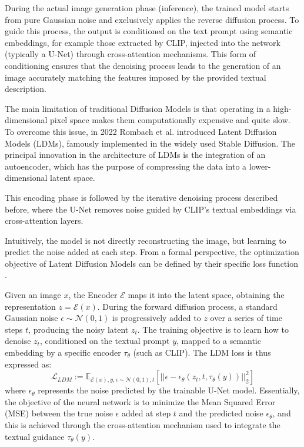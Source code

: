 \documentclass[10pt,twocolumn,letterpaper]{article}
\begin{document}
During the actual image generation phase (inference), the trained model starts from pure Gaussian noise and exclusively applies the reverse diffusion process. To guide this process, the output is conditioned on the text prompt using semantic embeddings, for example those extracted by CLIP, injected into the network (typically a U-Net) through cross-attention mechanisms. This form of conditioning ensures that the denoising process leads to the generation of an image accurately matching the features imposed by the provided textual description.

The main limitation of traditional Diffusion Models is that operating in a high-dimensional pixel space makes them computationally expensive and quite slow. To overcome this issue, in 2022 Rombach et al. \cite{Rombach_2022_CVPR} introduced Latent Diffusion Models (LDMs), famously implemented in the widely used Stable Diffusion.
The principal innovation in the architecture of LDMs is the integration of an autoencoder, which has the purpose of compressing the data into a lower-dimensional latent space. 

This encoding phase is followed by the iterative denoising process described before, where the U-Net removes noise guided by CLIP's textual embeddings via cross-attention layers.

Intuitively, the model is not directly reconstructing the image, but learning to predict the noise added at each step. From a formal perspective, the optimization objective of Latent Diffusion Models can be defined by their specific loss function \cite{Rombach_2022_CVPR}. 

Given an image $x$, the Encoder $\mathcal{E}$ maps it into the latent space, obtaining the representation $z = \mathcal{E}(x)$. During the forward diffusion process, a standard Gaussian noise $\epsilon \sim \mathcal{N}(0, 1)$ is progressively added to $z$ over a series of time steps $t$, producing the noisy latent $z_t$. The training objective is to learn how to denoise $z_t$, conditioned on the textual prompt $y$, mapped to a semantic embedding by a specific encoder $\tau_\theta$ (such as CLIP). The LDM loss is thus expressed as:
$$\mathcal{L}_{LDM} := \mathbb{E}_{\mathcal{E}(x), y, \epsilon \sim \mathcal{N}(0, 1), t} \left[ \big|\big| \epsilon - \epsilon_\theta(z_t, t, \tau_\theta(y)) \big|\big|_2^2 \right]$$
where $\epsilon_\theta$ represents the noise predicted by the trainable U-Net model. Essentially, the objective of the neural network is to minimize the Mean Squared Error (MSE) between the true noise $\epsilon$ added at step $t$ and the predicted noise $\epsilon_\theta$, and this is achieved through the cross-attention mechanism used to integrate the textual guidance $\tau_\theta(y)$.
\end{document}

